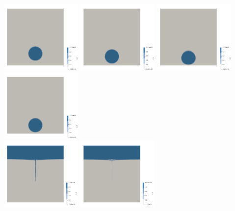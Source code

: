 \newpage
\begin{center}
\includegraphics[width=4cm]{images/stokes_sphere_fs2D/aspects/C1_a}
\includegraphics[width=4cm]{images/stokes_sphere_fs2D/aspects/C1_g}
\includegraphics[width=4cm]{images/stokes_sphere_fs2D/aspects/C1_h}
\includegraphics[width=4cm]{images/stokes_sphere_fs2D/aspects/C1_m}\\
\includegraphics[width=4cm]{images/stokes_sphere_fs2D/aspects/C2_a}
\includegraphics[width=4cm]{images/stokes_sphere_fs2D/aspects/C2_g}

\end{center}
